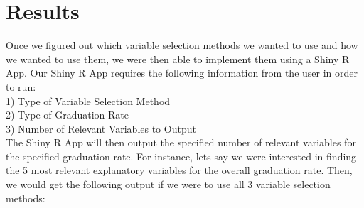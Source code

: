 \documentclass{article}
\begin{document}


\section{Results}
Once we figured out which variable selection methods we wanted to use and how we wanted to use them, we were then able to implement them using a Shiny R App. Our Shiny R App requires the following information from the user in order to run:\\

1) Type of Variable Selection Method\\
2) Type of Graduation Rate\\
3) Number of Relevant Variables to Output\\

The Shiny R App will then output the specified number of relevant variables for the specified graduation rate. For instance, lets say we were interested in finding the 5 most relevant explanatory variables for the overall graduation rate. Then, we would get the following output if we were to use all 3 variable selection methods:\\
\end{document}
